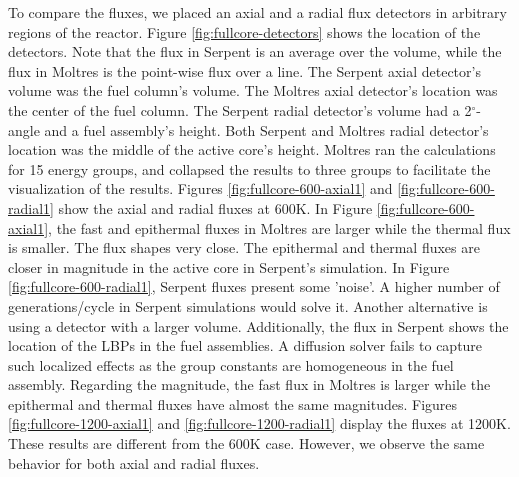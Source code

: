 \documentclass[11pt,letterpaper]{article}
\begin{document}
To compare the fluxes, we placed an axial and a radial flux detectors in arbitrary regions of the reactor.
Figure \ref{fig:fullcore-detectors} shows the location of the detectors.
Note that the flux in Serpent is an average over the volume, while the flux in Moltres is the point-wise flux over a line.
The Serpent axial detector's volume was the fuel column's volume.
The Moltres axial detector's location was the center of the fuel column.
The Serpent radial detector's volume had a 2$^{\circ}$-angle and a fuel assembly's height.
Both Serpent and Moltres radial detector's location was the middle of the active core's height.
Moltres ran the calculations for 15 energy groups, and collapsed the results to three groups to facilitate the visualization of the results.
Figures \ref{fig:fullcore-600-axial1} and \ref{fig:fullcore-600-radial1} show the axial and radial fluxes at 600K.
In Figure \ref{fig:fullcore-600-axial1}, the fast and epithermal fluxes in Moltres are larger while the thermal flux is smaller.
The flux shapes very close.
The epithermal and thermal fluxes are closer in magnitude in the active core in Serpent's simulation.
In Figure \ref{fig:fullcore-600-radial1}, Serpent fluxes present some 'noise'.
A higher number of generations/cycle in Serpent simulations would solve it.
Another alternative is using a detector with a larger volume.
Additionally, the flux in Serpent shows the location of the LBPs in the fuel assemblies.
A diffusion solver fails to capture such localized effects as the group constants are homogeneous in the fuel assembly.
Regarding the magnitude, the fast flux in Moltres is larger while the epithermal and thermal fluxes have almost the same magnitudes.
Figures \ref{fig:fullcore-1200-axial1} and \ref{fig:fullcore-1200-radial1} display the fluxes at 1200K.
These results are different from the 600K case.
However, we observe the same behavior for both axial and radial fluxes.
\end{document}
